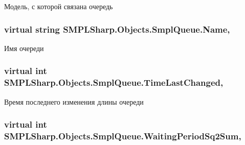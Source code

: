 Модель, с которой связана очередь 

\hypertarget{class_s_m_p_l_sharp_1_1_objects_1_1_smpl_queue_af8121cfdf0a8b265c860ae764af1ab33}{
\subsubsection[{Name}]{\setlength{\rightskip}{0pt plus 5cm}virtual string S\-M\-P\-L\-Sharp.\-Objects.\-Smpl\-Queue.\-Name\hspace{0.3cm}{\ttfamily [get]}, {\ttfamily [set]}}}\label{d3/ded/class_s_m_p_l_sharp_1_1_objects_1_1_smpl_queue_af8121cfdf0a8b265c860ae764af1ab33}


Имя очереди 

\hypertarget{class_s_m_p_l_sharp_1_1_objects_1_1_smpl_queue_a93a68f8fefe39b5dafa2145e6ec3fa99}{
\subsubsection[{Time\-Last\-Changed}]{\setlength{\rightskip}{0pt plus 5cm}virtual int S\-M\-P\-L\-Sharp.\-Objects.\-Smpl\-Queue.\-Time\-Last\-Changed\hspace{0.3cm}{\ttfamily [get]}, {\ttfamily [set]}}}\label{d3/ded/class_s_m_p_l_sharp_1_1_objects_1_1_smpl_queue_a93a68f8fefe39b5dafa2145e6ec3fa99}


Время последнего изменения длины очереди 

\hypertarget{class_s_m_p_l_sharp_1_1_objects_1_1_smpl_queue_aadbd85e6bd504c71fb38c568c771c49b}{
\subsubsection[{Waiting\-Period\-Sq2\-Sum}]{\setlength{\rightskip}{0pt plus 5cm}virtual int S\-M\-P\-L\-Sharp.\-Objects.\-Smpl\-Queue.\-Waiting\-Period\-Sq2\-Sum\hspace{0.3cm}{\ttfamily [get]}, {\ttfamily [set]}}}\label{d3/ded/class_s_m_p_l_sharp_1_1_objects_1_1_smpl_queue_aadbd85e6bd504c71fb38c568c771c49b}


